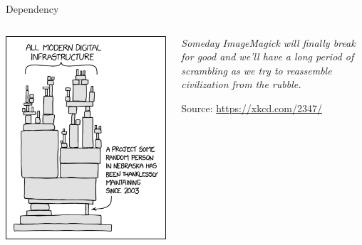 
\begin{frame}[t,plain]
\titlepage
\end{frame}


\begin{frame}{Dependency}
%
\begin{columns}[T]
\vspace{-12pt}
\begin{center}
	\includegraphics[width=.7\linewidth]{./gfx/11-xkcd-dependency}
\end{center}
%
\vspace{+40pt}
\begin{center}
	\emph{Someday ImageMagick will finally break for good and we'll have a long period of scrambling as we try to reassemble civilization from the rubble.}
	
	\vspace{12pt}
	Source: \url{https://xkcd.com/2347/}
\end{center}
\end{columns}
%
\end{frame}


